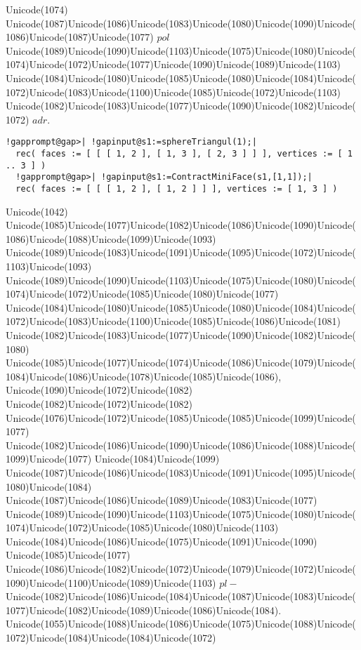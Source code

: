 \documentclass[a4paper,11pt]{report}
\begin{document}
{{{ Unicode(1074)
Unicode(1087)Unicode(1086)Unicode(1083)Unicode(1080)Unicode(1090)Unicode(1086)Unicode(1087)Unicode(1077) $pol$ Unicode(1089)Unicode(1090)Unicode(1103)Unicode(1075)Unicode(1080)Unicode(1074)Unicode(1072)Unicode(1077)Unicode(1090)Unicode(1089)Unicode(1103)
Unicode(1084)Unicode(1080)Unicode(1085)Unicode(1080)Unicode(1084)Unicode(1072)Unicode(1083)Unicode(1100)Unicode(1085)Unicode(1072)Unicode(1103)
Unicode(1082)Unicode(1083)Unicode(1077)Unicode(1090)Unicode(1082)Unicode(1072) $adr.$ 
\begin{Verbatim}[commandchars=!@|,fontsize=\small,frame=single,label=Пример]
  !gapprompt@gap>| !gapinput@s1:=sphereTriangul(1);|
  rec( faces := [ [ [ 1, 2 ], [ 1, 3 ], [ 2, 3 ] ] ], vertices := [ 1 .. 3 ] )
  !gapprompt@gap>| !gapinput@s1:=ContractMiniFace(s1,[1,1]);|
  rec( faces := [ [ [ 1, 2 ], [ 1, 2 ] ] ], vertices := [ 1, 3 ] )
\end{Verbatim}
 Unicode(1042)
Unicode(1085)Unicode(1077)Unicode(1082)Unicode(1086)Unicode(1090)Unicode(1086)Unicode(1088)Unicode(1099)Unicode(1093)
Unicode(1089)Unicode(1083)Unicode(1091)Unicode(1095)Unicode(1072)Unicode(1103)Unicode(1093)
Unicode(1089)Unicode(1090)Unicode(1103)Unicode(1075)Unicode(1080)Unicode(1074)Unicode(1072)Unicode(1085)Unicode(1080)Unicode(1077)
Unicode(1084)Unicode(1080)Unicode(1085)Unicode(1080)Unicode(1084)Unicode(1072)Unicode(1083)Unicode(1100)Unicode(1085)Unicode(1086)Unicode(1081)
Unicode(1082)Unicode(1083)Unicode(1077)Unicode(1090)Unicode(1082)Unicode(1080)
Unicode(1085)Unicode(1077)Unicode(1074)Unicode(1086)Unicode(1079)Unicode(1084)Unicode(1086)Unicode(1078)Unicode(1085)Unicode(1086),
Unicode(1090)Unicode(1072)Unicode(1082)
Unicode(1082)Unicode(1072)Unicode(1082)
Unicode(1076)Unicode(1072)Unicode(1085)Unicode(1085)Unicode(1099)Unicode(1077)
Unicode(1082)Unicode(1086)Unicode(1090)Unicode(1086)Unicode(1088)Unicode(1099)Unicode(1077)
Unicode(1084)Unicode(1099)
Unicode(1087)Unicode(1086)Unicode(1083)Unicode(1091)Unicode(1095)Unicode(1080)Unicode(1084)
Unicode(1087)Unicode(1086)Unicode(1089)Unicode(1083)Unicode(1077)
Unicode(1089)Unicode(1090)Unicode(1103)Unicode(1075)Unicode(1080)Unicode(1074)Unicode(1072)Unicode(1085)Unicode(1080)Unicode(1103)
Unicode(1084)Unicode(1086)Unicode(1075)Unicode(1091)Unicode(1090)
Unicode(1085)Unicode(1077)
Unicode(1086)Unicode(1082)Unicode(1072)Unicode(1079)Unicode(1072)Unicode(1090)Unicode(1100)Unicode(1089)Unicode(1103) $pl-$Unicode(1082)Unicode(1086)Unicode(1084)Unicode(1087)Unicode(1083)Unicode(1077)Unicode(1082)Unicode(1089)Unicode(1086)Unicode(1084).
Unicode(1055)Unicode(1088)Unicode(1086)Unicode(1075)Unicode(1088)Unicode(1072)Unicode(1084)Unicode(1084)Unicode(1072)
}}}
\end{document}
